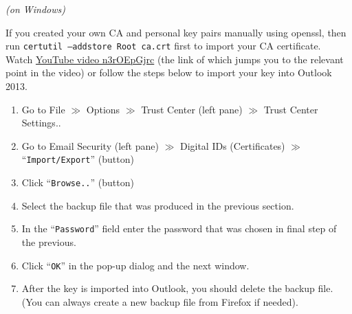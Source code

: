 \documentclass[pdftex,12pt,titlepage=false]{scrartcl}
\begin{document}
\begin{minipage}[t]{0.6\textwidth}
  \centerline{\textsl{(on Windows)}} If you created your own CA and
  personal key pairs manually using openssl, then run \texttt{certutil
    –addstore Root ca.crt} first to import your CA certificate.\\[0.5em]

  Watch
  \href{https://www.youtube.com/watch?v=n3rOEpGjrc\&start=390}{YouTube
    video n3rOEpGjrc} (the link of which jumps you to the relevant
  point in the video)
  or follow the steps below to import your key into Outlook 2013.
  \begin{enumerate}
  \item Go to File $\gg$ Options $\gg$ Trust Center (left pane) $\gg$
    Trust Center Settings..
  \item Go to Email Security (left pane) $\gg$ Digital IDs
    (Certificates) $\gg$ ``\texttt{Import/Export}'' (button)
  \item Click ``\texttt{Browse..}'' (button)
  \item Select the backup file that was produced in the previous
    section.
  \item In the ``\texttt{Password}'' field enter the password that was
    chosen in final step of the previous.
  \item Click ``\texttt{OK}'' in the pop-up dialog and the next
    window.
  \item After the key is imported into Outlook, you should delete the
    backup file.  (You can always create a new backup file from
    Firefox if needed).
\end{enumerate}
\end{minipage}
\end{document}
